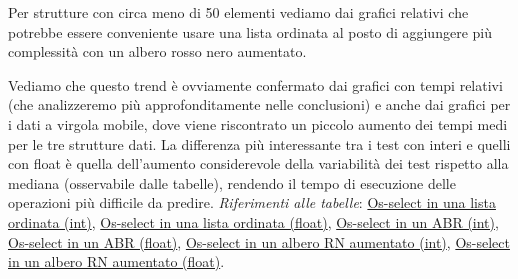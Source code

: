 \documentclass[onecolumn]{article}
\begin{document}
Per strutture con circa meno di 50 elementi vediamo dai grafici relativi che potrebbe essere conveniente usare una lista ordinata al posto di aggiungere più complessità con un albero rosso nero aumentato.

Vediamo che questo trend è ovviamente confermato dai grafici con tempi relativi (che analizzeremo più approfonditamente nelle conclusioni) e anche dai grafici per i dati a virgola mobile, dove viene riscontrato un piccolo aumento dei tempi medi per le tre strutture dati. La differenza più interessante tra i test con interi e quelli con float è quella dell'aumento considerevole della variabilità dei test rispetto alla mediana (osservabile dalle tabelle), rendendo il tempo di esecuzione delle operazioni più difficile da predire.
\newline
\newline
\textit{Riferimenti alle tabelle}: \hyperref[label:lista-ordinata-s-os-select]{Os-select in una lista ordinata (int)}, \hyperref[label:lista-ordinata-s-float-os-select]{Os-select in una lista ordinata (float)}, \hyperref[label:abr-s-os-select]{Os-select in un ABR (int)}, \hyperref[label:abr-s-float-os-select]{Os-select in un ABR (float)}, \hyperref[label:rn-aumentato-s-os-select]{Os-select in un albero RN aumentato (int)}, \hyperref[label:rn-aumentato-s-float-os-select]{Os-select in un albero RN aumentato (float)}.
\end{document}
